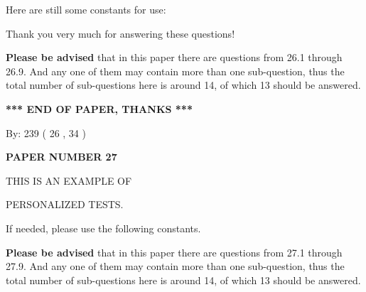 \documentclass[12pt]{article}
\begin{document}
   
   
 \vspace{0.2in}
Here are still some constants for use:
 
 
 
 
Thank you very much for answering these questions!
 
{\textbf{\large{Please be advised}}} that in this paper there are questions from
26.1 through
26.9.
And any one of them may contain more than one sub-question, thus the total number
of sub-questions here is around 14, of which
13 should be answered.
 
   
   
   
   
\vspace{1.0in} 
{\textbf{\large{ *** END OF PAPER, THANKS *** }}} 
   
   
\hspace{1.0in} By: 
         239 (          26 ,           34 )
   
   
   
   
\newpage 
\setcounter{page}{ 
    27001 } 
   
   
   
   
 {\textbf{ \Large{ PAPER NUMBER           27  }}}
   
   
\vspace{0.2in}
   
   
   
   
   
   
 \vspace{0.2in}
 
 
{\Huge  THIS IS AN EXAMPLE OF}
 
{\Huge  PERSONALIZED TESTS. }
 
If needed, please use the following constants.
 
 
 
{\textbf{\large{Please be advised}}} that in this paper there are questions from
27.1 through
27.9.
And any one of them may contain more than one sub-question, thus the total number
of sub-questions here is around 14, of which
13 should be answered.
 
\vspace{0.3in}
 
 
   
   
  
\vspace{0.2in}
  
\end{document}
